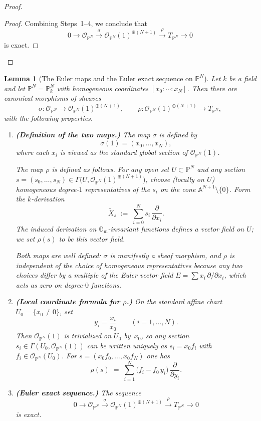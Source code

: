 \documentclass[11pt]{article}
\theoremstyle{plain}
\newtheorem{lemma}{Lemma}
\newcommand{\PP}{\mathbb{P}}
\newcommand{\OO}{\mathcal{O}}
\newcommand{\Gm}{\mathbb{G}_{\mathrm{m}}}
\begin{document}
\begin{proof}
\begin{proof}
\medskip
Combining Steps~1--4, we conclude that
\[
0\longrightarrow \OO_{\PP^N}
\xrightarrow{\ \sigma\ }
\OO_{\PP^N}(1)^{\oplus(N+1)}
\xrightarrow{\ \rho\ }
T_{\PP^N}
\longrightarrow 0
\]
is exact.
\end{proof}



\end{proof}






\begin{lemma}[The Euler maps and the Euler exact sequence on $\PP^N$]\label{lem:Euler-sequence-maps}
Let $k$ be a field and let $\PP^N=\PP^N_k$ with homogeneous coordinates
$[x_0:\cdots:x_N]$.  Then there are canonical morphisms of sheaves
\[
\sigma:\OO_{\PP^N}\longrightarrow \OO_{\PP^N}(1)^{\oplus (N+1)},
\qquad
\rho:\OO_{\PP^N}(1)^{\oplus (N+1)}\longrightarrow T_{\PP^N},
\]
with the following properties.

\begin{enumerate}
\item[\textup{(i)}] \textbf{(Definition of the two maps.)}
The map $\sigma$ is defined by
\[
\sigma(1)=(x_0,\dots,x_N),
\]
where each $x_i$ is viewed as the standard global section of $\OO_{\PP^N}(1)$.

The map $\rho$ is defined as follows.  For any open set $U\subset \PP^N$ and
any section $s=(s_0,\dots,s_N)\in \Gamma\!\big(U,\OO_{\PP^N}(1)^{\oplus(N+1)}\big)$,
choose (locally on $U$) homogeneous degree-$1$ representatives of the $s_i$ on the
cone $\mathbb{A}^{N+1}\setminus\{0\}$.  Form the $k$-derivation
\[
\widetilde{X}_s \;:=\; \sum_{i=0}^N s_i\,\frac{\partial}{\partial x_i}.
\]
The induced derivation on $\Gm$-invariant functions defines a vector field on $U$;
we set $\rho(s)$ to be this vector field.

Both maps are well defined: $\sigma$ is manifestly a sheaf morphism, and $\rho$ is
independent of the choice of homogeneous representatives because any two
choices differ by a multiple of the Euler vector field
$E=\sum x_i\,\partial/\partial x_i$, which acts as zero on degree-$0$ functions.

\item[\textup{(ii)}] \textbf{(Local coordinate formula for $\rho$.)}
On the standard affine chart $U_0=\{x_0\neq 0\}$, set
\[
y_i=\frac{x_i}{x_0}\qquad (i=1,\dots,N).
\]
Then $\OO_{\PP^N}(1)$ is trivialized on $U_0$ by~$x_0$, so any section
$s_i\in \Gamma(U_0,\OO_{\PP^N}(1))$ can be written uniquely as $s_i=x_0 f_i$ with
$f_i\in \OO_{\PP^N}(U_0)$.  For $s=(x_0 f_0,\dots,x_0 f_N)$ one has
\begin{equation}\label{eq:local-formula}
\rho(s)
\;=\;
\sum_{i=1}^N \bigl(f_i-f_0\,y_i\bigr)\,\frac{\partial}{\partial y_i}.
\end{equation}

\item[\textup{(iii)}] \textbf{(Euler exact sequence.)}
The sequence
\[
0\longrightarrow \OO_{\PP^N}
\xrightarrow{\ \sigma\ }
\OO_{\PP^N}(1)^{\oplus(N+1)}
\xrightarrow{\ \rho\ }
T_{\PP^N}
\longrightarrow 0
\]
is exact.
\end{enumerate}
\end{lemma}
\end{document}
